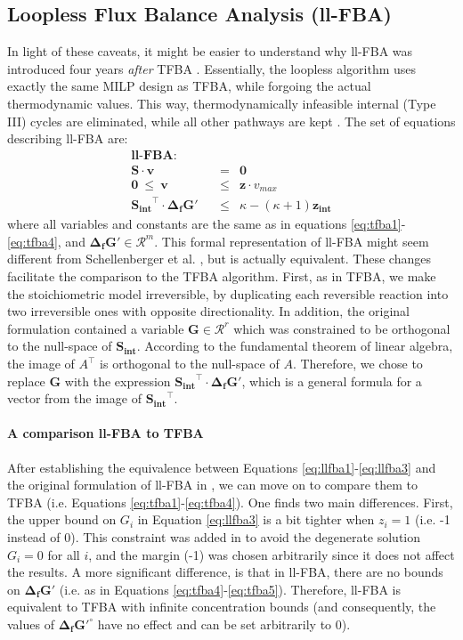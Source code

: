 \documentclass[twocolumn]{bmcart}%
\newcommand{\Sint}{\mathbf{S_{int}}}
\begin{document}
\subsection*{Loopless Flux Balance Analysis (ll-FBA)}
In light of these caveats, it might be easier to understand why ll-FBA was introduced four years \emph{after} TFBA \cite{Schellenberger2011-bq}. Essentially, the loopless algorithm uses exactly the same MILP design as TFBA, while forgoing the actual thermodynamic values. This way, thermodynamically infeasible internal (Type III) cycles are eliminated, while all other pathways are kept \cite{Noor2012-qb}. The set of equations describing ll-FBA are:
\begin{eqnarray}
\textbf{ll-FBA:~~~~~~~~} && \nonumber\\
\mathbf{S} \cdot \mathbf{v} &=& \mathbf{0} \label{eq:llfba1} \\
\mathbf{0} ~\leq~ \mathbf{v} &\leq & \mathbf{z} \cdot v_{max} \label{eq:llfba2} \\
\Sint ^\top \cdot \mathbf{\Delta_f G'} &\leq & \kappa - (\kappa+1)\mathbf{z_{int}} \label{eq:llfba3}
\end{eqnarray}
where all variables and constants are the same as in equations \ref{eq:tfba1}-\ref{eq:tfba4}, and $\mathbf{\Delta_f G'} \in \mathcal{R}^{m}$. This formal representation of ll-FBA might seem different from Schellenberger et al. \cite{Schellenberger2011-bq}, but is actually equivalent. These changes facilitate the comparison to the TFBA algorithm. First, as in TFBA, we make the stoichiometric model irreversible, by duplicating each reversible reaction into two irreversible ones with opposite directionality. In addition, the original formulation contained a variable $\mathbf{G} \in \mathcal{R}^{r}$ which was constrained to be orthogonal to the null-space of $\Sint$. According to the fundamental theorem of linear algebra, the image of $A^\top$ is orthogonal to the null-space of $A$. Therefore, we chose to replace $\mathbf{G}$ with the expression $\Sint^\top \cdot \mathbf{\Delta_f G'}$, which is a general formula for a vector from the image of $\Sint^\top$.

\paragraph{A comparison ll-FBA to TFBA} After establishing the equivalence between Equations \ref{eq:llfba1}-\ref{eq:llfba3} and the original formulation of ll-FBA in \cite{Schellenberger2011-bq}, we can move on to compare them to TFBA (i.e. Equations \ref{eq:tfba1}-\ref{eq:tfba4}). One finds two main differences. First, the upper bound on $G_i$ in Equation \ref{eq:llfba3} is a bit tighter when $z_i = 1$ (i.e. -1 instead of 0). This constraint was added in \cite{Schellenberger2011-bq} to avoid the degenerate solution $G_i = 0$ for all $i$, and the margin (-1) was chosen arbitrarily since it does not affect the results. A more significant difference, is that in ll-FBA, there are no bounds on $\mathbf{\Delta_f G'}$ (i.e. as in Equations \ref{eq:tfba4}-\ref{eq:tfba5}). Therefore, ll-FBA is equivalent to TFBA with infinite concentration bounds (and consequently, the values of $\mathbf{\Delta_f G'^\circ}$ have no effect and can be set arbitrarily to 0).
\end{document}
